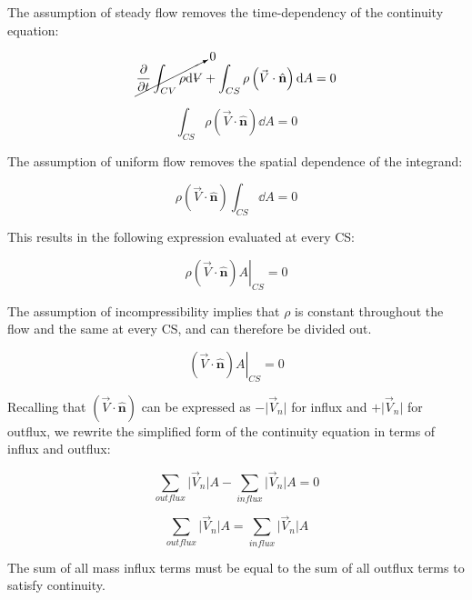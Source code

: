 \documentclass[../main.tex]{subfiles}
\begin{document}
The assumption of steady flow removes the time-dependency of the continuity equation:

\begin{equation*}
    \cancelto{0}{\pdv{t} \int_{CV} \rho \dd \volume} +%
    \int_{CS} \rho \left({\vec{V} \cdot \hat{\mathbf{n}}}\right) \dd A
    = 0
\end{equation*}

\begin{equation*}
    \int_{CS} \rho \left({\vec{V} \cdot \hat{\mathbf{n}}}\right) \dd A
    = 0
\end{equation*}

The assumption of uniform flow removes the spatial dependence of the integrand:

\begin{equation*}
    \rho \left({\vec{V} \cdot \hat{\mathbf{n}}}\right) \int_{CS} \dd A
    = 0
\end{equation*}

This results in the following expression evaluated at every CS:

\begin{equation*}
    \left. \rho \left({\vec{V} \cdot \hat{\mathbf{n}}}\right) A \right|_{CS}
    = 0
\end{equation*}

The assumption of incompressibility implies that $\rho$ is constant throughout the flow and the same at every CS, and can therefore be divided out.

\begin{equation*}
    \left. \left({\vec{V} \cdot \hat{\mathbf{n}}}\right) A \right|_{CS}
    = 0
\end{equation*}

Recalling that \(\left({\vec{V} \cdot \hat{\mathbf{n}}}\right)\) can be expressed as \({-\lvert{\vec{V}_n}\rvert}\) for influx and \({+\lvert{\vec{V}_n}\rvert}\) for outflux, we rewrite the simplified form of the continuity equation in terms of influx and outflux:

\begin{equation*}
    \sum_{outflux} {\lvert{\vec{V}_n}\rvert A} -%
    \sum_{influx}  {\lvert{\vec{V}_n}\rvert A} = 0
\end{equation*}

\begin{equation*}
    \sum_{outflux} {\lvert{\vec{V}_n}\rvert A} = %
    \sum_{influx}  {\lvert{\vec{V}_n}\rvert A}
\end{equation*}

The sum of all mass influx terms must be equal to the sum of all outflux terms to satisfy continuity.
\end{document}
